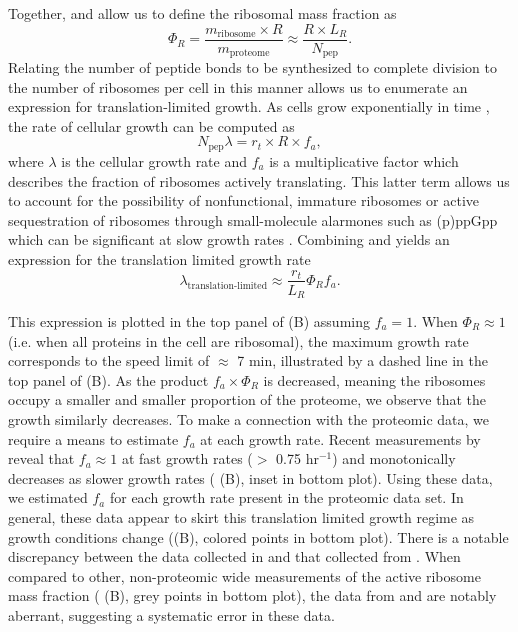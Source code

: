 Together,  and  allow us to define the ribosomal mass
fraction as 
\begin{equation}
  \Phi_R = \frac{m_\text{ribosome} \times R}{m_\text{proteome}} \approx \frac{R \times L_R}{N_\text{pep}}.
  \label{eq:phir}
\end{equation}
Relating the number of peptide bonds to be synthesized to complete division to
the number of ribosomes per cell in this manner allows us to enumerate an
expression for translation-limited growth. As cells grow exponentially in time
\cite{godin2010}, the rate of cellular growth can be computed as 
\begin{equation}
N_\text{pep} \lambda = r_t \times R \times f_a,
\label{eq:exp_cell_growth}
\end{equation}
where $\lambda$ is the cellular growth rate and $f_a$ is a multiplicative factor
which describes the fraction of ribosomes actively translating. This latter term
allows us to account for the possibility of nonfunctional, immature ribosomes or
active sequestration of ribosomes through small-molecule alarmones such as
(p)ppGpp which can be significant at slow growth rates \citep{dennis2004,
dai2016}. Combining  and  yields an expression for
the translation limited growth rate 
\begin{equation}
\lambda_\text{translation-limited} \approx \frac{r_t}{L_R}\Phi_Rf_a.
\label{eq:lam_lim}
\end{equation}

This expression is plotted in the top panel of (B) assuming $f_a =
1$. When $\Phi_R \approx 1$ (i.e. when all proteins in the cell are ribosomal),
the maximum growth rate corresponds to the speed limit of $\approx$ 7 min,
illustrated by a dashed line in the top panel of (B). As the product
$f_a \times \Phi_R$ is
decreased, meaning the ribosomes occupy a smaller and smaller proportion of the
proteome, we observe that the growth similarly decreases. To make a connection
with the proteomic data, we require a means to estimate $f_a$ at each growth
rate. Recent measurements by \cite{dai2016} reveal that $f_a \approx 1$ at fast
growth rates ($>$ 0.75 hr$^{-1}$) and monotonically decreases as slower growth
rates ( (B), inset in bottom plot). Using these data, we estimated
$f_a$ for each growth rate present in the proteomic data set. In general, these
data appear to skirt this translation limited growth regime as growth conditions
change ((B), colored points in bottom plot). There is a notable
discrepancy between the data collected in \cite{schmidt2016, li2014} and that
collected from \cite{valgepea2013, peebo2015}. When compared to other,
non-proteomic wide measurements of the active ribosome mass fraction
( (B), grey points in bottom plot), the data from \cite{valgepea2013}
and \cite{peebo2015} are notably aberrant, suggesting a systematic error in
these data. 


